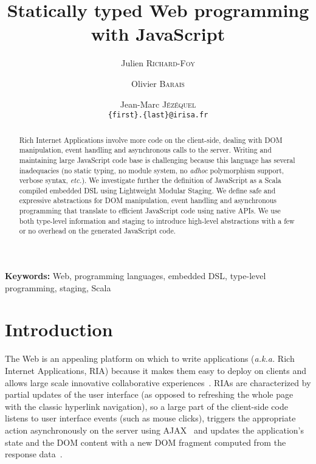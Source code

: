 \documentclass[american,english,runningheads]{llncs}
\newcommand{\etc}{\emph{etc.}}
\newcommand{\aka}{\emph{a.k.a.}}
\newcommand{\noun}[1]{\textsc{#1}}
\begin{document}
\title{Statically typed Web programming with JavaScript}

\author{Julien \noun{Richard-Foy} \and Olivier \noun{Barais} \and Jean-Marc \noun{Jézéquel}\\
\texttt{\{first\}.\{last\}@irisa.fr}}


\maketitle


\begin{abstract}
Rich Internet Applications involve more code on the client-side, dealing with DOM manipulation, event handling and asynchronous calls to the server. Writing and maintaining large JavaScript code base is challenging because this language has several inadequacies (no static typing, no module system, no \emph{adhoc} polymorphism support, verbose syntax, \etc{}). We investigate further the definition of JavaScript as a Scala compiled embedded DSL using Lightweight Modular Staging. We define safe and expressive abstractions for DOM manipulation, event handling and asynchronous programming that translate to efficient JavaScript code using native APIs. We use both type-level information and staging to introduce high-level abstractions with a few or no overhead on the generated JavaScript code.
\end{abstract}

{\bf Keywords:} Web, programming languages, embedded DSL, type-level programming, staging, Scala

\section{Introduction}

The Web is an appealing platform on which to write applications (\aka{} Rich Internet Applications, RIA) because it makes them easy to deploy on clients and allows large scale innovative collaborative experiences~\cite{Farrell07_RIA,Mikkonen08_SpaghettiJs}. RIAs are characterized by partial updates of the user interface (as opposed to refreshing the whole page with the classic hyperlink navigation), so a large part of the client-side code listens to user interface events (such as mouse clicks), triggers the appropriate action asynchronously on the server using AJAX~\cite{Garrett05_Ajax} and updates the application’s state and the DOM content with a new DOM fragment computed from the response data~\cite{Farrell07_RIA,Busch09_StateOfArtRIA}.
\end{document}
